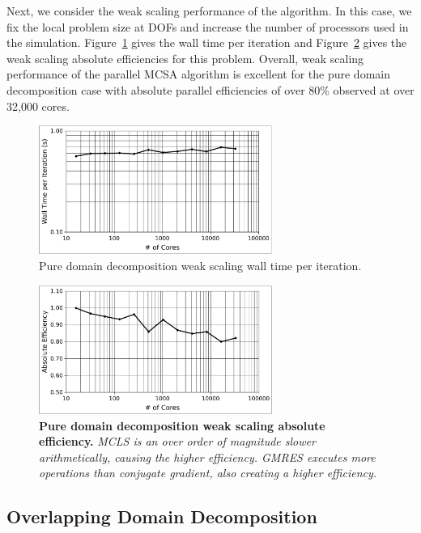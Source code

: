 \documentclass{snamc2013}
\begin{document}
Next, we consider the weak scaling performance of the algorithm. In
this case, we fix the local problem size at  DOFs and
increase the number of processors used in the
simulation. Figure~\ref{fig:titan_pure_weak_time} gives the wall time
per iteration and Figure~\ref{fig:titan_weak_absolute} gives the weak
scaling absolute efficiencies for this problem. Overall, weak scaling
performance of the parallel MCSA algorithm is excellent for the pure
domain decomposition case with absolute parallel efficiencies of over
80\% observed at over 32,000 cores.

\begin{figure}[p!]
  \begin{center}
    \includegraphics[width=3in]{titan_pure_weak_time.pdf}
  \end{center}
  \caption{Pure domain decomposition weak scaling wall time
      per iteration.}
  \label{fig:titan_pure_weak_time}
\end{figure}

\begin{figure}[h!]
  \begin{center}
    \includegraphics[width=3in]{titan_weak_absolute.pdf}
  \end{center}
  \caption{\textbf{Pure domain decomposition weak scaling absolute
      efficiency.} \textit{MCLS is an over order of magnitude slower
      arithmetically, causing the higher efficiency. GMRES executes
      more operations than conjugate gradient, also creating a higher
      efficiency.}}
  \label{fig:titan_weak_absolute}
\end{figure}

\subsection{Overlapping Domain Decomposition}
\label{subsec:overlapping_domain_decomp}
\end{document}
